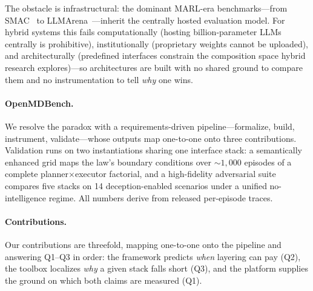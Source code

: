 \documentclass[sigconf,anonymous]{aamas}
\begin{document}
The obstacle is infrastructural: the dominant MARL-era benchmarks---from SMAC~\cite{smac} to LLMArena~\cite{llmarena}---inherit the centrally hosted evaluation model. For hybrid systems this fails computationally (hosting billion-parameter LLMs centrally is prohibitive), institutionally (proprietary weights cannot be uploaded), and architecturally (predefined interfaces constrain the composition space hybrid research explores)---so architectures are built with no shared ground to compare them and no instrumentation to tell \emph{why} one wins.

\paragraph{OpenMDBench.}
We resolve the paradox with a requirements-driven pipeline---formalize, build, instrument, validate---whose outputs map one-to-one onto three contributions. Validation runs on two instantiations sharing one interface stack: a semantically enhanced grid maps the law's boundary conditions over ${\sim}1{,}000$ episodes of a complete planner$\times$executor factorial, and a high-fidelity adversarial suite compares five stacks on 14 deception-enabled scenarios under a unified no-intelligence regime. All numbers derive from released per-episode traces.

\paragraph{Contributions.}
Our contributions are threefold, mapping one-to-one onto the pipeline and answering Q1--Q3 in order: the framework predicts \emph{when} layering can pay (Q2), the toolbox localizes \emph{why} a given stack falls short (Q3), and the platform supplies the ground on which both claims are measured (Q1).
\end{document}
